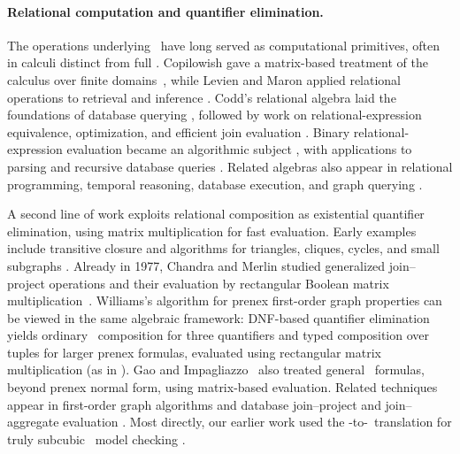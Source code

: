 \paragraph{Relational computation and quantifier elimination.}
The operations underlying \CoR\ have long served as computational
primitives, often in calculi distinct from full \CoR.
Copilowish gave a matrix-based treatment of the calculus over finite
domains~\citep{copilowish1948}, while Levien and Maron applied relational
operations to retrieval and inference
\citep{levien-maron1965,levien-maron1967,levien1969}.
Codd's relational algebra laid the foundations of database querying
\citep{Codd1970,Codd1972}, followed by work on relational-expression
equivalence, optimization, and efficient join evaluation
\citep{aho-sagiv-ullman1979equiv,aho-sagiv-ullman1979opt,
SelingerEtAl1979,yannakakis1981}.
Binary relational-expression evaluation became an algorithmic subject
\citep{hunt-szymanski-ullman1974,hunt-szymanski-ullman1977,
szymanski-ullman1975,szymanski-ullman1977}, with applications to parsing
and recursive database queries
\citep{sippu-soisalon-soininen1985,grahne-sippu-soisalon-soininen1987,
grahne-sippu-soisalon-soininen1991}.
Related algebras also appear in relational programming, temporal
reasoning, database execution, and graph querying
\citep{maclennan1981,montanari1974,allen1983,boncz-kersten1999,
cruz-mendelzon-wood1987,FletcherEtAl2015,HellingsEtAl2021,
HellingsEtAl2022}.

A second line of work exploits relational composition as existential
quantifier elimination, using matrix multiplication for fast evaluation.
Early examples include transitive closure
\citep{furman1970,fischer-meyer1971,munro1971,oneil-oneil1973,
galil-margalit1993} and algorithms for triangles, cliques, cycles,
and small subgraphs
\citep{itai-rodeh1978,nesetril-poljak1985,alon-yuster-zwick1997,
kloks-kratsch-mueller2000,eisenbrand-grandoni2004,yuster-zwick2004}.
Already in 1977, Chandra and Merlin studied generalized join--project
operations and their evaluation by rectangular Boolean matrix
multiplication~\citep{ChandraMerlin1977}.
Williams's algorithm for prenex first-order graph properties
\citep{Williams2014} can be viewed in the same algebraic framework:
DNF-based quantifier elimination yields ordinary \CoR\ composition
for three quantifiers and typed composition over tuples for larger
prenex formulas, evaluated using rectangular matrix multiplication
(as in \citep{ChandraMerlin1977}).
Gao and Impagliazzo\ \citep{GaoImpagliazzo2019} also treated general
\FOthree\ formulas, beyond prenex normal form, using matrix-based
evaluation.
Related techniques appear in first-order graph algorithms
\citep{BringmannFischerKunnemann2019} and database join--project
and join--aggregate evaluation
\citep{DeepHuKoutris2020,hu-yi2020,Hu2024,AboKhamisHuSuciu2025}.
Most directly, our earlier work used the \FOthree-to-\CoR\ translation
for truly subcubic \FOthree\ model checking
\citep{nakamura-uezato2027}.

